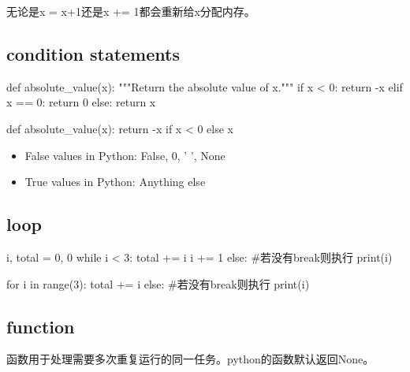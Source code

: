       无论是x = x+1还是x += 1都会重新给x分配内存。

  \subsection{condition statements}
    \begin{codeblock}[language=python, caption={condition statement}]
      def absolute_value(x):
        """Return the absolute value of x."""
        if x < 0:
          return -x
        elif x == 0:
          return 0
        else:
          return x

      def absolute_value(x):
        return -x if x < 0 else x
    \end{codeblock}

    \begin{itemize}
      \item False values in Python: False, 0, ' ', None
      \item True values in Python: Anything else
    \end{itemize}

  \subsection{loop}
    \begin{codeblock}[language=python, caption={iteration}]
      i, total = 0, 0
      while i < 3:
          total += i
          i += 1
      else: #若没有break则执行
          print(i)

      for i in range(3):
          total += i
      else: #若没有break则执行
          print(i)
    \end{codeblock}

  \subsection{function}
    函数用于处理需要多次重复运行的同一任务。python的函数默认返回None。
